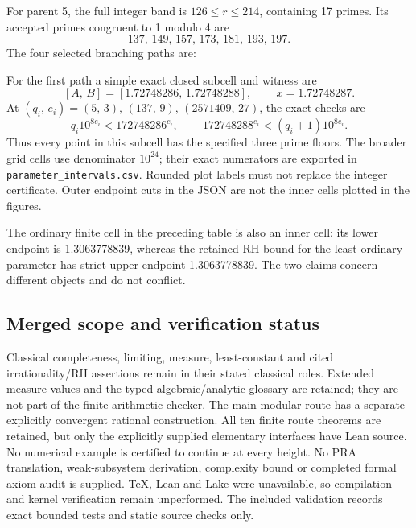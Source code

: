 \documentclass[11pt,reqno]{amsart}
\newlength{\CenteredRowHeight}
\newcommand{\CenteredTableWidths}[6]{%
  \def\CenteredWidthA{#1}\def\CenteredWidthB{#2}%
  \def\CenteredWidthC{#3}\def\CenteredWidthD{#4}%
  \def\CenteredWidthE{#5}\def\CenteredWidthF{#6}}
\newcommand{\CenteredMeasure}[3]{%
  \global\setbox#1=\hbox{\parbox[c]{#2}{%
    \centering\setlength{\parindent}{0pt}#3\par}}%
  \ifdim\dimexpr\ht#1+\dp#1\relax>\CenteredRowHeight
    \global\CenteredRowHeight=\dimexpr\ht#1+\dp#1\relax
  \fi}
\newcommand{\CenteredRender}[2]{%
  \parbox[c][\CenteredRowHeight][c]{#2}{%
    \centering\setlength{\parindent}{0pt}\usebox{#1}\par}}
\newcommand{\CenteredRowThree}[4][0pt]{%
  \global\CenteredRowHeight=0pt\relax%
  \CenteredMeasure{\CenteredBoxA}{\CenteredWidthA}{#2}%
  \CenteredMeasure{\CenteredBoxB}{\CenteredWidthB}{#3}%
  \CenteredMeasure{\CenteredBoxC}{\CenteredWidthC}{#4}%
  \global\advance\CenteredRowHeight by \dimexpr 2pt+#1\relax%
  \CenteredRender{\CenteredBoxA}{\CenteredWidthA} &%
  \CenteredRender{\CenteredBoxB}{\CenteredWidthB} &%
  \CenteredRender{\CenteredBoxC}{\CenteredWidthC}}
\theoremstyle{blueplain}
\newcounter{type}
\newcounter{asser}
\providecommand{\comma}{\allowbreak,\,}
\numberwithin{equation}{section}
\begin{document}
For parent 5, the full integer band is \(126\le r\le214\), containing
17 primes. Its accepted primes congruent to 1 modulo 4 are
\[
137\comma149\comma157\comma173\comma181\comma193\comma197.
\]
The four selected branching paths are:
\begin{table}[H]\centering\scriptsize
\caption{Four finite modular paths, not the complete tree.}\label{tab:mod-branches}
\CenteredTableWidths{3cm}{5.2cm}{7.2cm}{1pt}{1pt}{1pt}
\end{table}
For the first path a simple exact closed subcell and witness are
\[
[A\comma B]=[1.72748286\comma1.72748288]\comma\qquad
x=1.72748287.
\]
At \((q_i\comma e_i)=(5\comma3)\comma(137\comma9)\comma(2571409\comma27)\),
the exact checks are
\[
q_i10^{8e_i}<172748286^{e_i}\comma\qquad
172748288^{e_i}<(q_i+1)10^{8e_i}.
\]
Thus every point in this subcell has the specified three prime floors.
The broader grid cells use denominator \(10^{24}\); their exact
numerators are exported in \texttt{parameter\_intervals.csv}. Rounded
plot labels must not replace the integer certificate. Outer endpoint
cuts in the JSON are not the inner cells plotted in the figures.

The ordinary finite cell in the preceding table is also an inner cell:
its lower endpoint is 1.3063778839, whereas the retained RH bound for
the least ordinary parameter has strict upper endpoint 1.3063778839.
The two claims concern different objects and do not conflict.

\subsection{Merged scope and verification status}\label{sec:merged-status}
Classical completeness, limiting, measure, least-constant and cited
irrationality/RH assertions remain in their stated classical roles.
Extended measure values and the typed algebraic/analytic glossary are
retained; they are not part of the finite arithmetic checker. The main
modular route has a separate explicitly convergent rational construction. All ten finite
route theorems are retained, but only the explicitly supplied elementary
interfaces have Lean source. No numerical example is certified to
continue at every height. No PRA translation, weak-subsystem derivation,
complexity bound or completed formal axiom audit is supplied. TeX,
Lean and Lake were unavailable, so compilation and kernel verification
remain unperformed. The included validation records exact bounded tests
and static source checks only.
\newpage
\end{document}
